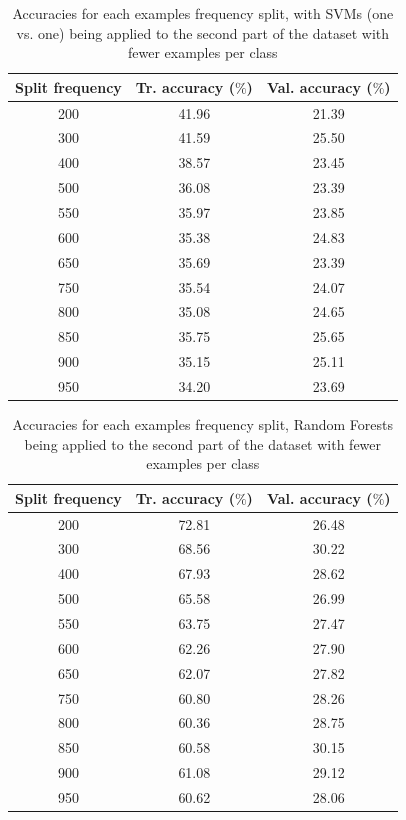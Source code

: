 \documentclass[10pt,twocolumn,letterpaper]{article}
\begin{document}
\begin{table}[h!]
  \begin{center}
    \label{tab:svms_splitted_second}
    \begin{tabular}{c|c|c} %
      \textbf{Split frequency} & \textbf{Tr. accuracy ($\%$)} & \textbf{Val. accuracy ($\%$)}\\
      \hline
      200 & 41.96 & 21.39\\
      300 & 41.59 & 25.50\\
      400 & 38.57 & 23.45\\
      500 & 36.08 & 23.39\\
      550 & 35.97 & 23.85\\
      600 & 35.38 & 24.83\\
      650 & 35.69 & 23.39\\
      750 & 35.54 & 24.07\\
      800 & 35.08 & 24.65\\
      850 & 35.75 & 25.65\\
      900 & 35.15 & 25.11\\
      950 & 34.20 & 23.69\\
    \end{tabular}
    \caption{Accuracies for each examples frequency split, with SVMs (one vs. one) being applied to the second part of the dataset with fewer examples per class}
  \end{center}
\end{table}

\begin{table}[h!]
  \begin{center}
    \label{tab:rf_splitted_second}
    \begin{tabular}{c|c|c} %
      \textbf{Split frequency} & \textbf{Tr. accuracy ($\%$)} & \textbf{Val. accuracy ($\%$)}\\
      \hline
      200 & 72.81 & 26.48\\
      300 & 68.56 & 30.22\\
      400 & 67.93 & 28.62\\
      500 & 65.58 & 26.99\\
      550 & 63.75 & 27.47\\
      600 & 62.26 & 27.90\\
      650 & 62.07 & 27.82\\
      750 & 60.80 & 28.26\\
      800 & 60.36 & 28.75\\
      850 & 60.58 & 30.15\\
      900 & 61.08 & 29.12\\
      950 & 60.62 & 28.06\\
    \end{tabular}
    \caption{Accuracies for each examples frequency split, Random Forests being applied to the second part of the dataset with fewer examples per class}
  \end{center}
\end{table}
\end{document}
